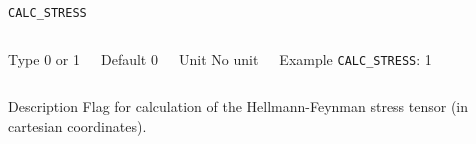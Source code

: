 \documentclass[xcolor=dvipsnames,t]{beamer}
\begin{document}
\begin{frame}[allowframebreaks]{\texttt{CALC\_STRESS}} \label{CALC_STRESS}
\vspace*{-12pt}
\begin{columns}
\begin{block}{Type}
0 or 1
\end{block}

\begin{block}{Default}
0
\end{block}

\begin{block}{Unit}
No unit
\end{block}

\begin{block}{Example}
\texttt{CALC\_STRESS}: 1
\end{block}
\end{columns}

\begin{block}{Description}
Flag for calculation of the Hellmann-Feynman stress tensor (in cartesian coordinates).
\end{block}


\end{frame}
\end{document}
